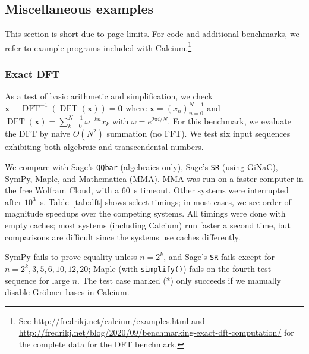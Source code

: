 \documentclass[11pt,a4paper]{article}
\begin{document}
\subsection{Miscellaneous examples}

This section is short due to page limits.
For code and additional benchmarks, we refer to
example programs included with Calcium.\footnote{See \url{http://fredrikj.net/calcium/examples.html}
and \url{http://fredrikj.net/blog/2020/09/benchmarking-exact-dft-computation/} for the complete data for the DFT benchmark.}

\subsubsection{Exact DFT}

As a test of basic arithmetic and simplification,
we check $\textbf{x} - \operatorname{DFT}^{-1}(\operatorname{DFT}(\textbf{x})) = \textbf{0}$
where $\textbf{x} = (x_n)_{n=0}^{N-1}$ and $\operatorname{DFT}(\textbf{x}) = \sum_{k=0}^{N-1} \omega^{-kn} x_k$
with $\omega = e^{2 \pi i / N}$. For this benchmark, we evaluate
the DFT by naive $O(N^2)$ summation (no FFT).
We test six input sequences exhibiting both algebraic and transcendental numbers.

We compare with Sage's \texttt{QQbar} (algebraics only), Sage's \texttt{SR} (using GiNaC),
SymPy, Maple, and Mathematica (MMA).
MMA was run on a faster computer in the free Wolfram Cloud, with a 60~s timeout. Other systems were interrupted after $10^3$~s.
Table~\ref{tab:dft} shows select timings;
in most cases, we see order-of-magnitude speedups over
the competing systems.
All timings were done with empty caches;
most systems (including Calcium) run faster a second time,
but comparisons are difficult since
the systems use caches differently.

SymPy fails to prove equality unless $n = 2^k$, and Sage's \texttt{SR} fails except for $n = 2^k, 3, 5, 6, 10, 12, 20$;
Maple (with \texttt{simplify()}) fails on the fourth test sequence for large $n$.
The test case marked (*) only succeeds if we manually disable Gr\"{o}bner bases in Calcium.
\end{document}
